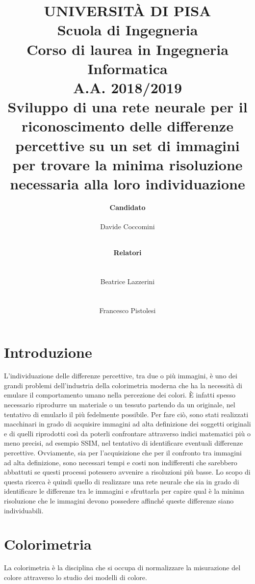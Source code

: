 \documentclass[a4paper,11pt]{article}
\author{
        \rule{0in}{0pt}\textbf{\Large Candidato} \\
        \rule{0in}{0pt}Davide Coccomini \\
        \and
        \rule{1.5in}{0pt}\textbf{\Large Relatori}\\
        \rule{1.5in}{0pt}Beatrice Lazzerini\\
        \rule{1.5in}{0pt}Francesco Pistolesi \\
    }
\title{\textbf{UNIVERSITÀ DI PISA} \\[0.4in]
    Scuola di Ingegneria \\
    Corso di laurea in Ingegneria Informatica \\
    A.A. 2018/2019\\[0.7in]
    Sviluppo di una rete neurale per il riconoscimento delle differenze
    percettive su un set di immagini per trovare la minima risoluzione
    necessaria alla loro individuazione \\[0.8in]}
\date{}
\begin{document}
    \pagestyle{fancy}
    \fancyhf{}
    \fancyhead[L]{\rightmark}
    
    \fancyfoot{}
    \fancyfoot[LE,RO]{\thepage}    
    \renewcommand{\footrulewidth}{0.4pt}
    \maketitle
    \newpage
        \tableofcontents
        \newpage
        \section{Introduzione}
        L'individuazione delle differenze percettive, tra due o più immagini, è uno dei grandi problemi dell'industria della colorimetria moderna che ha la necessità di emulare il 
        comportamento umano nella percezione dei colori. È infatti spesso necessario riprodurre un materiale o un tessuto partendo da un originale, nel tentativo di emularlo il più fedelmente possibile. 
        Per fare ciò, sono stati realizzati macchinari in grado di acquisire immagini ad alta definizione dei soggetti originali e di quelli riprodotti così da poterli confrontare attraverso indici matematici più o meno precisi, ad esempio SSIM,
        nel tentativo di identificare eventuali differenze percettive. Ovviamente, sia per l'acquisizione che per il confronto tra immagini ad alta definizione, sono necessari tempi e costi non indifferenti che sarebbero abbattuti se questi processi potessero avvenire a risoluzioni più basse.
        Lo scopo di questa ricerca è quindi quello di realizzare una rete neurale che sia in grado di identificare le differenze tra le immagini e sfruttarla per capire qual è la minima risoluzione che le immagini devono possedere affinché queste differenze siano individuabili.
    
        \newpage
        \section{Colorimetria}
        La colorimetria è la disciplina che si occupa di normalizzare la misurazione del colore attraverso lo studio dei modelli di colore.
\end{document}
